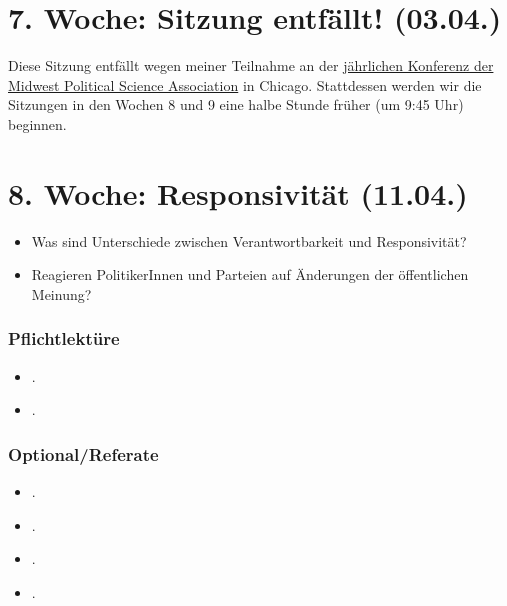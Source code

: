 \documentclass[abstract=on,parskip=full,headings=standardclasses,fontsize=11pt,paper=a4]{scrartcl}
\begin{document}
\section{7. Woche:  Sitzung entfällt! (03.04.)}


Diese Sitzung entfällt wegen meiner Teilnahme an der \href{https://www.mpsanet.org/conference}{jährlichen Konferenz der  Midwest Political Science Association} in Chicago.
Stattdessen werden wir die Sitzungen in den Wochen 8 und 9 eine halbe Stunde früher  (um 9:45 Uhr) beginnen. 


\section{8. Woche: Responsivität (11.04.)}

\begin{itemize}
\renewcommand\labelitemi{--}
\item Was sind Unterschiede zwischen Verantwortbarkeit und Responsivität? 
\item Reagieren PolitikerInnen und Parteien auf Änderungen der öffentlichen Meinung?
\end{itemize}

\subsubsection*{Pflichtlektüre}
\begin{itemize}
\item {}.
\item {}.
\end{itemize}

\subsubsection*{Optional/Referate}
\begin{itemize}
\item {}.
\item {}.
\item {}.
\item {}.
\end{itemize}



\end{document}
